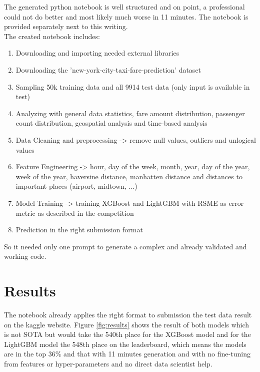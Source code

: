 \documentclass[fontsize=11pt, paper=a4, pagesize=auto]{scrreprt}
\begin{document}
	The generated python notebook is well structured and on point, a professional could not do better and most likely much worse in 11 minutes. The notebook is provided separately next to this writing.\\
	The created notebook includes:
	\begin{enumerate}[itemsep=1mm, parsep=0pt]
		\item Downloading and importing needed external libraries
		\item Downloading the 'new-york-city-taxi-fare-prediction' dataset
		\item Sampling 50k training data and all 9914 test data (only input is available in test)
		\item Analyzing with general data statistics, fare amount distribution, passenger count distribution, geospatial analysis and time-based analysis
		\item Data Cleaning and preprocessing -> remove null values, outliers and unlogical values
		\item Feature Engineering -> hour, day of the week, month, year, day of the year, week of the year, haversine distance, manhatten distance and distances to important places (airport, midtown, ...)
		\item Model Training -> training XGBoost and LightGBM with RSME as error metric as described in the competition
		\item Prediction in the right submission format
	\end{enumerate} 
	
	So it needed only one prompt to generate a complex and already validated and working code.
	
	
	
\chapter{Results}
\label{cha:results}
	The notebook already applies the right format to submission the test data result on the kaggle website. Figure \ref{fig:results} shows the result of both models which is not SOTA but would take the 540th place for the XGBoost model and for the LightGBM model the 548th place on the leaderboard, which means the models are in the top 36\% and that with 11 minutes generation and with no fine-tuning from features or hyper-parameters and no direct data scientist help.
	
\end{document}
